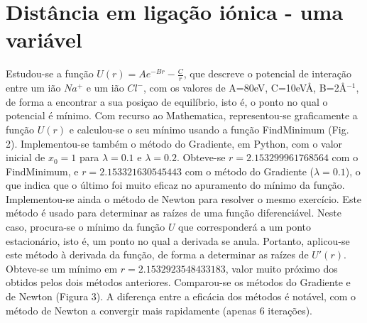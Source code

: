 \documentclass[aps,pre,twocolumn,showpacs,amsmath,amssymb]{revtex4-1}
\begin{document}
\section{Distância em ligação iónica - uma variável}

\indent \indent Estudou-se a função $U(r)=Ae^{-Br} - \frac{C}{r}$, que descreve o potencial de interação entre um ião $Na^+$ e um ião $Cl^-$, com os valores de A=80eV, C=10eVÅ, B=2Å$^{-1}$, de forma a encontrar a sua posiçao de equilíbrio, isto é, o ponto no qual o potencial é mínimo. \newline
\indent Com recurso ao Mathematica, representou-se graficamente a função $U(r)$ e calculou-se o seu mínimo usando a função FindMinimum (Fig. 2). Implementou-se também o método do Gradiente, em Python, com o valor inicial de $x_0=1$ para $\lambda=0.1$ e $\lambda=0.2$. Obteve-se $r=2.153299961768564$ com o FindMinimum, e $r=2.153321630545443$ com o método do Gradiente ($\lambda = 0.1$), o que indica que o último foi muito eficaz no apuramento do mínimo da função. \newline
\indent Implementou-se ainda o método de Newton para resolver o mesmo exercício. Este método é usado para determinar as raízes de uma função diferenciável. Neste caso, procura-se o mínimo da função $U$ que corresponderá a um ponto estacionário, isto é, um ponto no qual a derivada se anula. Portanto, aplicou-se este método à derivada da função, de forma a determinar as raízes de $U'(r)$. Obteve-se um mínimo em $r=2.1532923548433183$, valor muito próximo dos obtidos pelos dois métodos anteriores. \newline
\indent Comparou-se os métodos do Gradiente e de Newton (Figura 3). A diferença entre a eficácia dos métodos é notável, com o método de Newton a convergir mais rapidamente (apenas 6 iterações).
\end{document}
